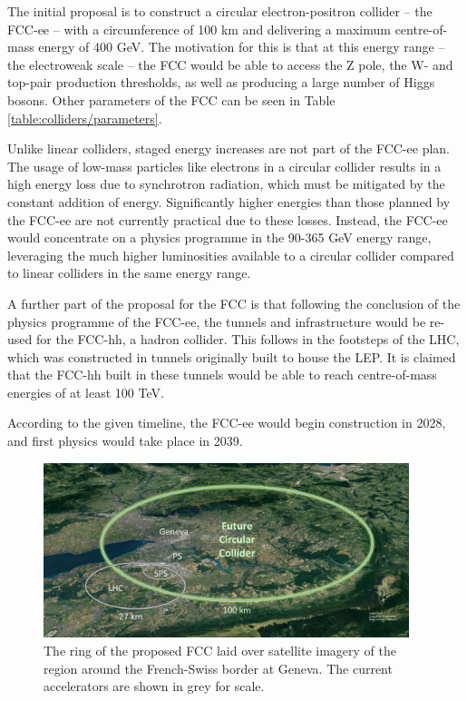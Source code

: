 The initial proposal is to construct a circular electron-positron collider -- the FCC-ee -- with a circumference of 100 km and delivering a maximum centre-of-mass energy of 400 GeV. The motivation for this is that at this energy range -- the electroweak scale -- the \acrshort{FCC} would be able to access the Z pole, the W- and top-pair production thresholds, as well as producing a large number of Higgs bosons. Other parameters of the \acrshort{FCC} can be seen in Table \ref{table:colliders/parameters}.

Unlike linear colliders, staged energy increases are not part of the FCC-ee plan. The usage of low-mass particles like electrons in a circular collider results in a high energy loss due to synchrotron radiation, which must be mitigated by the constant addition of energy. Significantly higher energies than those planned by the FCC-ee are not currently practical due to these losses. Instead, the FCC-ee would concentrate on a physics programme in the 90-365 GeV energy range, leveraging the much higher luminosities available to a circular collider compared to linear colliders in the same energy range.

A further part of the proposal for the \acrshort{FCC} is that following the conclusion of the physics programme of the FCC-ee, the tunnels and infrastructure would be re-used for the FCC-hh, a hadron collider. This follows in the footsteps of the \acrshort{LHC}, which was constructed in tunnels originally built to house the \acrfull{LEP}. It is claimed that the FCC-hh built in these tunnels would be able to reach centre-of-mass energies of at least 100 TeV.

According to the given timeline, the FCC-ee would begin construction in 2028, and first physics would take place in 2039. 

\begin{figure}[t]
	\centering
	\includegraphics[width=0.95\textwidth]{../Pictures/FCC-Scale.jpg}
	\caption{The ring of the proposed \acrlong{FCC} laid over satellite imagery of the region around the French-Swiss border at Geneva. The current accelerators are shown in grey for scale.}
	\label{figure:colliders/FCC/scale}
\end{figure}

